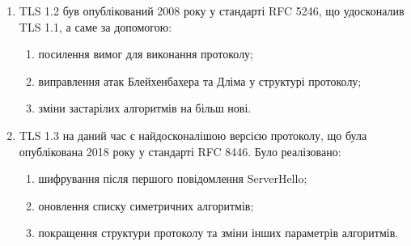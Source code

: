 \begin{enumerate}
    \item TLS 1.2 був опублікований 2008 року у стандарті RFC 5246, що удосконалив TLS 1.1, а саме за допомогою:
    \begin{enumerate}
        \item посилення вимог для виконання протоколу;
        \item виправлення атак Блейхенбахера та Дліма у структурі протоколу;
        \item зміни застарілих алгоритмів на більш нові.
    \end{enumerate}
    \item TLS 1.3 на даний час є найдосконалішою версією протоколу, що була опублікована 2018 року у стандарті RFC 8446. Було реалізовано:
    \begin{enumerate}
        \item шифрування після першого повідомлення ServerHello;
        \item оновлення списку симетричних алгоритмів;
        \item покращення структури протоколу та зміни інших параметрів алгоритмів.
    \end{enumerate}
\end{enumerate}
